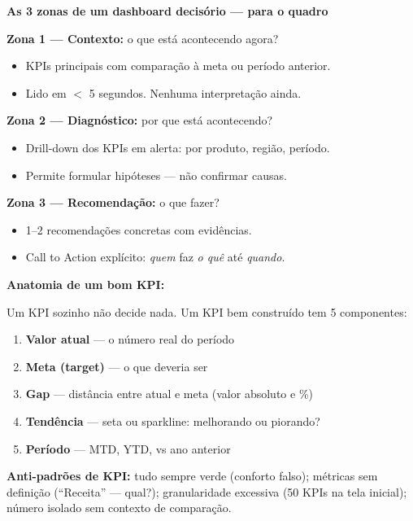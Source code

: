 \begin{BoardBox}
\textbf{As 3 zonas de um dashboard decisório — para o quadro}

\textbf{Zona 1 — Contexto:} o que está acontecendo agora?
\begin{itemize}
  \item KPIs principais com comparação à meta ou período anterior.
  \item Lido em $<$ 5 segundos. Nenhuma interpretação ainda.
\end{itemize}

\textbf{Zona 2 — Diagnóstico:} por que está acontecendo?
\begin{itemize}
  \item Drill-down dos KPIs em alerta: por produto, região, período.
  \item Permite formular hipóteses — não confirmar causas.
\end{itemize}

\textbf{Zona 3 — Recomendação:} o que fazer?
\begin{itemize}
  \item 1–2 recomendações concretas com evidências.
  \item Call to Action explícito: \emph{quem} faz \emph{o quê} até \emph{quando}.
\end{itemize}
\end{BoardBox}

\begin{SolvedBox}
\textbf{Anatomia de um bom KPI:}

Um KPI sozinho não decide nada. Um KPI bem construído tem 5 componentes:
\begin{enumerate}
  \item \textbf{Valor atual} — o número real do período
  \item \textbf{Meta (target)} — o que deveria ser
  \item \textbf{Gap} — distância entre atual e meta (valor absoluto e \%)
  \item \textbf{Tendência} — seta ou sparkline: melhorando ou piorando?
  \item \textbf{Período} — MTD, YTD, vs ano anterior
\end{enumerate}

\textbf{Anti-padrões de KPI:}
tudo sempre verde (conforto falso); métricas sem definição (``Receita'' — qual?);
granularidade excessiva (50 KPIs na tela inicial); número isolado sem contexto de comparação.
\end{SolvedBox}

